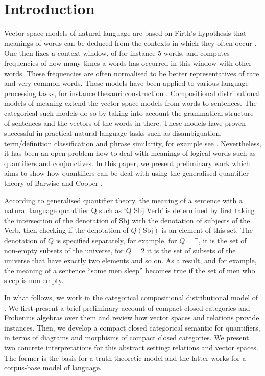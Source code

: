 \section{Introduction}

Vector space models of natural language are based on Firth's hypothesis that  meanings of words can be deduced from the contexts in which they often occur  \cite{Firth}.  One then fixes a context window, of for instance 5 words, and computes frequencies of how many times a words has occurred in this window with other words. These frequencies are often normalised to be better representatives of rare and very common words. These models have been applied to various language processing tasks, for instance thesauri construction \cite{Curran}.  Compositional distributional models of meaning extend the vector space models from words to sentences. The categorical such models \cite{Coeckeetal,BaroniZam} do so by taking into account the grammatical structure of sentences and the vectors of the words in there.  These models have proven successful in practical natural language tasks such as disambiguation, term/definition classification and phrase similarity, for example see \cite{GrefenSadr,kartsaklis2012}. Nevertheless, it has been an open problem how to deal  with  meanings of logical words such as  quantifiers and conjunctives. In this paper, we present preliminary work which aims to show how quantifiers can be deal with using the generalised quantifier  theory  of Barwise and Cooper \cite{BarwiseCooper81}. 

According to  generalised quantifier theory, the meaning of a sentence with a natural language  quantifier Q such as  `Q Sbj Verb' is determined by first taking the intersection of the denotation of Sbj with the denotation of subjects of the Verb, then checking if the denotation of $Q(\text{Sbj})$ is an element of this set. The denotation of $Q$ is specified separately, for example, for $Q = \exists$, it is the set of non-empty subsets of the universe, for $Q = 2$ it is  the set of  subsets of the universe that have exactly two elements and so on. As a result, and for example, the meaning of a sentence ``some men sleep'' becomes  true if the set of men who sleep is non empty. 


In what follows,  we work in the categorical compositional distributional model of \cite{Coeckeetal}. We  first present  a brief preliminary account of compact closed categories and Frobenius algebras over them and review  how vector spaces and relations provide instances. Then, we develop a compact closed categorical semantic for quantifiers, in terms of diagrams and morphisms of compact closed categories. We present two concrete interpretations for this abstract setting: relations and vector spaces. The former is the basis for  a truth-theoretic model and the latter works for a corpus-base model of language. 

